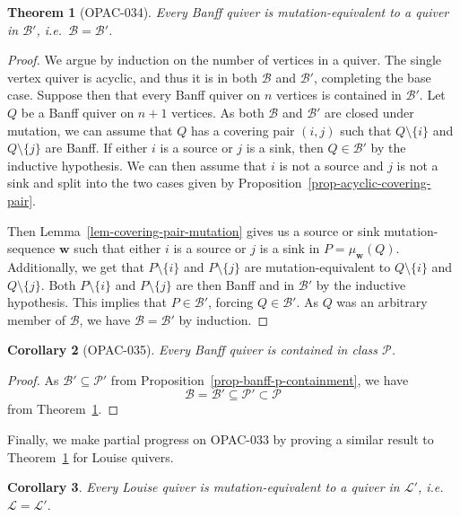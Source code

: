\documentclass[10pt]{amsart}
\newtheorem{thm}{Theorem}[section]
\newtheorem{coro}[thm]{Corollary}
\theoremstyle{definition}
\theoremstyle{remark}
\newcommand{\ie}{i.e.\ }
\newcommand{\BB}{\mathcal{B}}
\newcommand{\PP}{\mathcal{P}}
\newcommand{\LL}{\mathcal{L}}
\newcommand{\bw}{{\boldsymbol{w}}}
\begin{document}
\begin{thm}[OPAC-034] \label{thm-opac-034}
    Every Banff quiver is mutation-equivalent to a quiver in $\BB'$, \ie $\BB = \BB'$.
\end{thm}

\begin{proof}
    We argue by induction on the number of vertices in a quiver.
    The single vertex quiver is acyclic, and thus it is in both $\BB$ and $\BB'$, completing the base case.
    Suppose then that every Banff quiver on $n$ vertices is contained in $\BB'$.
    Let $Q$ be a Banff quiver on $n+1$ vertices.
    As both $\BB$ and $\BB'$ are closed under mutation, we can assume that $Q$ has a covering pair $(i,j)$ such that $Q \setminus \{i\}$ and $Q \setminus \{j\}$ are Banff.
    If either $i$ is a source or $j$ is a sink, then $Q \in \BB'$ by the inductive hypothesis.
    We can then assume that $i$ is not a source and $j$ is not a sink and split into the two cases given by Proposition~\ref{prop-acyclic-covering-pair}.

    Then Lemma~\ref{lem-covering-pair-mutation} gives us a source or sink mutation-sequence $\bw$ such that either $i$ is a source or $j$ is a sink in $P = \mu_\bw(Q)$.
    Additionally, we get that $P \setminus \{i\}$ and $P \setminus \{j\}$ are mutation-equivalent to $Q \setminus \{i\}$ and $Q \setminus \{j\}$.
    Both $P \setminus \{i\}$ and $P \setminus \{j\}$ are then Banff and in $\BB'$ by the inductive hypothesis.
    This implies that $P \in \BB'$, forcing $Q \in \BB'$.
    As $Q$ was an arbitrary member of $\BB$, we have $\BB = \BB'$ by induction.
\end{proof}

\begin{coro}[OPAC-035] \label{cor-opac-035}
    Every Banff quiver is contained in class $\PP$.
\end{coro}

\begin{proof}
    As $\BB' \subseteq \PP'$ from Proposition~\ref{prop-banff-p-containment},  we have
    $$\BB = \BB' \subseteq \PP' \subset \PP$$
    from Theorem~\ref{thm-opac-034}.
\end{proof}

Finally, we make partial progress on OPAC-033 by proving a similar result to Theorem~\ref{thm-opac-034} for Louise quivers.

\begin{coro} \label{cor-louise-louise-prime}
    Every Louise quiver is mutation-equivalent to a quiver in $\LL'$, \ie $\LL= \LL'$.
\end{coro}
\end{document}
